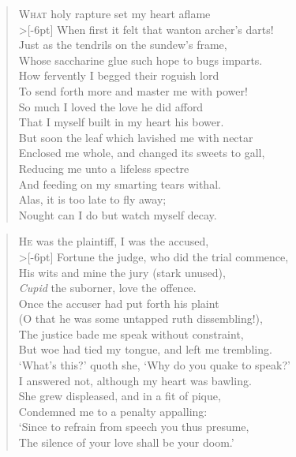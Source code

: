 \documentclass[a5paper, 12pt, oneside]{memoir}
\begin{document}
\PoemTitle{}
\begin{verse}
    \lettrine{W}{hat} holy rapture set my heart aflame \\>[-6pt]
    When first it felt that wanton archer's darts! \\
    Just as the tendrils on the sundew's frame, \\
    Whose saccharine glue such hope to bugs imparts. \\
    How fervently I begged their roguish lord \\
    To send forth more and master me with power! \\
    So much I loved the love he did afford \\
    That I myself built in my heart his bower. \\
    But soon the leaf which lavished me with nectar \\
    Enclosed me whole, and changed its sweets to gall, \\
    Reducing me unto a lifeless spectre \\
    And feeding on my smarting tears withal. \\
    \vin Alas, it is too late to fly away; \\
    \vin Nought can I do but watch myself decay.
\end{verse}

\PoemTitle{}
\begin{verse}
    \lettrine{H}{e} was the plaintiff, I was the accused, \\>[-6pt]
    Fortune the judge, who did the trial commence, \\
    His wits and mine the jury (stark unused), \\
    \textit{Cupid} the suborner, love the offence. \\
    Once the accuser had put forth his plaint \\
    (O that he was some untapped ruth dissembling!), \\
    The justice bade me speak without constraint, \\
    But woe had tied my tongue, and left me trembling. \\
    `What's this?' quoth she, `Why do you quake to speak?' \\
    I answered not, although my heart was bawling. \\
    She grew displeased, and in a fit of pique, \\
    Condemned me to a penalty appalling: \\
    \vin `Since to refrain from speech you thus presume, \\
    \vin The silence of your love shall be your doom.'
\end{verse}
\end{document}
